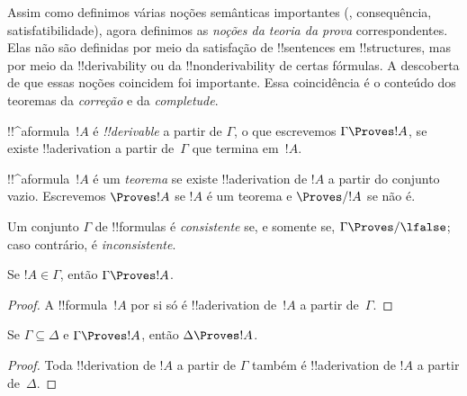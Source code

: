 \documentclass[../../../include/open-logic-section]{subfiles}
\begin{document}
      {}
      {}


\begin{explain}
Assim como definimos várias noções semânticas importantes
(, consequência, satisfatibilidade),
agora definimos as \emph{noções da teoria da prova} correspondentes.
Elas não são definidas por meio da satisfação de !!{sentence}s em
!!{structure}s, mas por meio da !!{derivability} ou da
!!{nonderivability} de certas fórmulas. A descoberta de que essas
noções coincidem foi importante. Essa coincidência é o conteúdo dos
teoremas da \emph{correção} e da \emph{completude}.
\end{explain}

\begin{defn}[!!^{derivability}]
!!^a{formula}~$!A$ é \emph{!!{derivable}} a partir de $\Gamma$, o que
escrevemos $\Gamma \Proves !A$, se existe !!a{derivation} a partir
de~$\Gamma$ que termina em~$!A$.
\end{defn}

\begin{defn}[Teoremas]
!!^a{formula}~$!A$ é um \emph{teorema} se existe !!a{derivation} de
$!A$ a partir do conjunto vazio. Escrevemos $\Proves !A$ se $!A$ é um
teorema e $\Proves/ !A$ se não é.
\end{defn}

\begin{defn}[Consistência]
Um conjunto $\Gamma$ de !!{formula}s é \emph{consistente} se, e somente
se, $\Gamma\Proves/ \lfalse$; caso contrário, é \emph{inconsistente}.
\end{defn}

\begin{prop}[Reflexividade]
Se $!A \in \Gamma$, então $\Gamma \Proves !A$.
\end{prop}

\begin{proof}
  A !!{formula}~$!A$ por si só é !!a{derivation} de~$!A$ a partir de~$\Gamma$.
\end{proof}

\begin{prop}[Monotonicidade]
Se $\Gamma \subseteq \Delta$ e $\Gamma \Proves !A$, então $\Delta
\Proves !A$.
\end{prop}

\begin{proof}
Toda !!{derivation} de $!A$ a partir de $\Gamma$ também é !!a{derivation}
de $!A$ a partir de~$\Delta$.
\end{proof}
\end{document}
